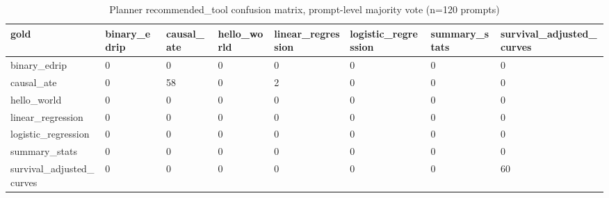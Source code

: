 \begin{table}[ht]
\centering
\caption{Planner recommended\_tool confusion matrix, prompt-level majority vote (n=120 prompts)}
\label{tab:planner_confusion_matrix_majority_vote}
\begin{tabular}{llllllll}
\toprule
gold & binary\_edrip & causal\_ate & hello\_world & linear\_regression & logistic\_regression & summary\_stats & survival\_adjusted\_curves \\
\midrule
binary\_edrip & 0 & 0 & 0 & 0 & 0 & 0 & 0 \\
causal\_ate & 0 & 58 & 0 & 2 & 0 & 0 & 0 \\
hello\_world & 0 & 0 & 0 & 0 & 0 & 0 & 0 \\
linear\_regression & 0 & 0 & 0 & 0 & 0 & 0 & 0 \\
logistic\_regression & 0 & 0 & 0 & 0 & 0 & 0 & 0 \\
summary\_stats & 0 & 0 & 0 & 0 & 0 & 0 & 0 \\
survival\_adjusted\_curves & 0 & 0 & 0 & 0 & 0 & 0 & 60 \\
\bottomrule
\end{tabular}
\end{table}
